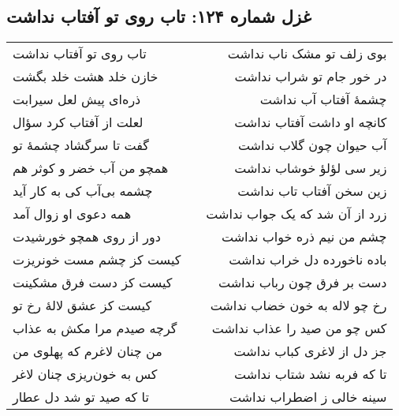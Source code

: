 \begin{center}
\section*{غزل شماره ۱۲۴: تاب روی تو آفتاب نداشت}
\label{sec:124}
\begin{longtable}{l p{0.5cm} r}
تاب روی تو آفتاب نداشت
&&
بوی زلف تو مشک ناب نداشت
\\
خازن خلد هشت خلد بگشت
&&
در خور جام تو شراب نداشت
\\
ذره‌ای پیش لعل سیرابت
&&
چشمهٔ آفتاب آب نداشت
\\
لعلت از آفتاب کرد سؤال
&&
کانچه او داشت آفتاب نداشت
\\
گفت تا سرگشاد چشمهٔ تو
&&
آب حیوان چون گلاب نداشت
\\
همچو من آب خضر و کوثر هم
&&
زیر سی لؤلؤ خوشاب نداشت
\\
چشمه بی‌آب کی به کار آید
&&
زین سخن آفتاب تاب نداشت
\\
همه دعوی او زوال آمد
&&
زرد از آن شد که یک جواب نداشت
\\
دور از روی همچو خورشیدت
&&
چشم من نیم ذره خواب نداشت
\\
کیست کز چشم مست خونریزت
&&
باده ناخورده دل خراب نداشت
\\
کیست کز دست فرق مشکینت
&&
دست بر فرق چون رباب نداشت
\\
کیست کز عشق لالهٔ رخ تو
&&
رخ چو لاله به خون خضاب نداشت
\\
گرچه صیدم مرا مکش به عذاب
&&
کس چو من صید را عذاب نداشت
\\
من چنان لاغرم که پهلوی من
&&
جز دل از لاغری کباب نداشت
\\
کس به خون‌ریزی چنان لاغر
&&
تا که فربه نشد شتاب نداشت
\\
تا که صید تو شد دل عطار
&&
سینه خالی ز اضطراب نداشت
\\
\end{longtable}
\end{center}

